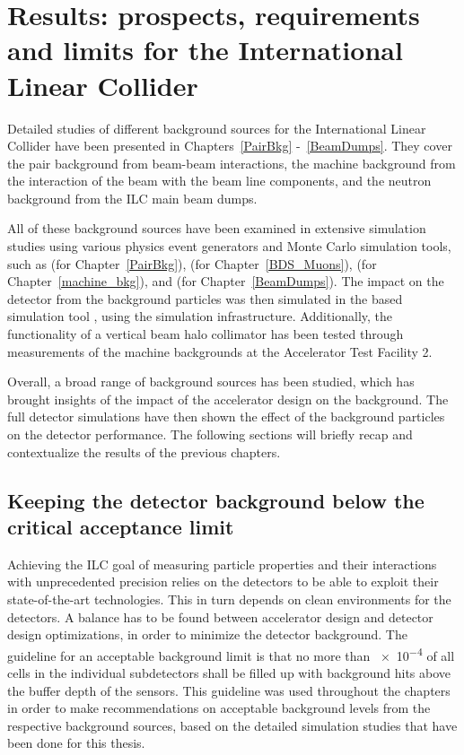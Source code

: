 \chapter{Results: prospects, requirements and limits for the International Linear Collider}
\label{Results}
Detailed studies of different background sources for the International Linear Collider have been presented in Chapters~\ref{PairBkg} -~\ref{BeamDumps}.
They cover the \positron\electron pair background from beam-beam interactions, the machine background from the interaction of the beam with the beam line components, and the neutron background from the ILC main beam dumps.

All of these background sources have been examined in extensive simulation studies using various physics event generators and Monte Carlo simulation tools, such as \guineapig (for Chapter~\ref{PairBkg}), \mucarlo (for Chapter~\ref{BDS_Muons}), \bdsim (for Chapter~\ref{machine_bkg}), and \fluka (for Chapter~\ref{BeamDumps}).
The impact on the \sid detector from the background particles was then simulated in the \geant based simulation tool \slic, using the \sid simulation infrastructure.
Additionally, the functionality of a vertical beam halo collimator has been tested through measurements of the machine backgrounds at the Accelerator Test Facility 2.

Overall, a broad range of background sources has been studied, which has brought insights of the impact of the accelerator design on the background.
The full detector simulations have then shown the effect of the background particles on the \sid detector performance.
The following sections will briefly recap and contextualize the results of the previous chapters.

\section{Keeping the detector background below the critical acceptance limit}
Achieving the ILC goal of measuring particle properties and their interactions with unprecedented precision relies on the detectors to be able to exploit their state-of-the-art technologies.
This in turn depends on clean environments for the detectors.
A balance has to be found between accelerator design and detector design optimizations, in order to minimize the detector background.
The \sid guideline for an acceptable background limit is that no more than \num{e-4} of all cells in the individual subdetectors shall be filled up with background hits above the buffer depth of the sensors.
This guideline was used throughout the chapters in order to make recommendations on acceptable background levels from the respective background sources, based on the detailed simulation studies that have been done for this thesis.

